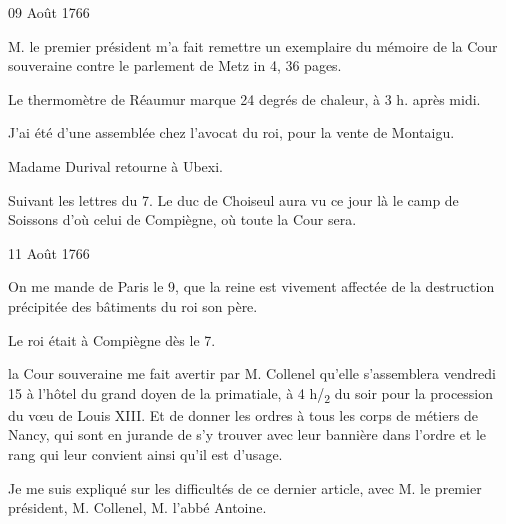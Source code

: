                      \begin{diary}{09 Août 1766}{}


                           M. le premier président m'a fait remettre un
                           exemplaire du mémoire de la Cour souveraine contre
                              le parlement de Metz
                              in 4\degre, 36 pages. \bigskip


                         Le thermomètre de Réaumur marque
                              24 degrés
                              de chaleur, à 3 h. après midi. \bigskip


                         J'ai été d'une assemblée chez
                           l'avocat du roi,
                           pour la vente de Montaigu. \bigskip



                           Madame Durival retourne à Ubexi. \bigskip



                           Suivant les lettres du 7.
                           Le duc de Choiseul
                           aura vu ce jour là le camp de
                              Soissons
                           d'où celui de Compiègne,
                           où toute la Cour sera. \bigskip


                     \end{diary}



                     \begin{diary}{11 Août 1766}{}

                         On me mande de Paris
                           le 9, que la reine
                           est vivement affectée de la destruction
                           précipitée des bâtiments du roi son père. \bigskip



                           Le roi était à Compiègne dès le 7. \bigskip



                           la Cour souveraine me fait avertir par M.
                              Collenel
                           qu'elle s'assemblera vendredi 15 à
                              l'hôtel du
                              grand doyen de la primatiale, à 4 h/\textsubscript{2} du soir
                           pour la procession du vœu de Louis
                              XIII. Et
                           de donner les ordres à tous les corps de métiers
                           de Nancy, qui sont en jurande de
                           s'y trouver
                           avec leur bannière dans l'ordre et le rang qui
                           leur convient ainsi qu'il est d'usage. \bigskip


                         Je me suis expliqué sur les
                           difficultés de ce
                           dernier article, avec M. le premier président,
                           M. Collenel, M. l'abbé Antoine.
                        \bigskip


                     \end{diary}

